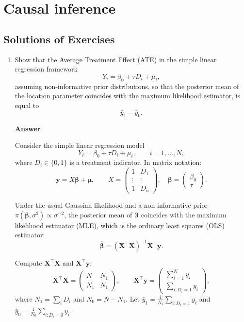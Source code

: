 \chapter{Causal inference}\label{chap12}

\section*{Solutions of Exercises}\label{sec12_1}
\begin{enumerate}[leftmargin=*]
\item Show that the Average Treatment Effect (ATE) in the simple linear regression framework
\[
Y_i = \beta_0 + \tau D_i + \mu_i,
\]
assuming non-informative prior distributions, so that the posterior mean of the location parameter coincides with the maximum likelihood estimator, is equal to
\[
\bar{y}_1 - \bar{y}_0.
\]

\textbf{Answer}

Consider the simple linear regression model
\[
Y_i = \beta_0 + \tau D_i + \mu_i, \qquad i = 1,\dots,N,
\]
where $D_i \in \{0,1\}$ is a treatment indicator. In matrix notation:
\[
\mathbf{y} = X \boldsymbol{\beta} + \boldsymbol{\mu}, \qquad
X = \begin{pmatrix}
	1 & D_1 \\
	\vdots & \vdots \\
	1 & D_n
\end{pmatrix}, \quad
\boldsymbol{\beta} = \begin{pmatrix}\beta_0 \\ \tau \end{pmatrix}.
\]

Under the usual Gaussian likelihood and a non-informative prior $\pi(\boldsymbol{\beta},\sigma^2) \propto \sigma^{-2}$, the posterior mean of $\boldsymbol{\beta}$ coincides with the maximum likelihood estimator (MLE), which is the ordinary least squares (OLS) estimator:
\[
\widehat{\boldsymbol{\beta}} = (\mathbf{X}^\top \mathbf{X})^{-1} \mathbf{X}^\top \mathbf{y}.
\]

Compute $\mathbf{X}^\top \mathbf{X}$ and $\mathbf{X}^\top \mathbf{y}$:
\[
\mathbf{X}^\top \mathbf{X} =
\begin{pmatrix}
	N & N_1 \\
	N_1 & N_1
\end{pmatrix}, \qquad
\mathbf{X}^\top \mathbf{y} =
\begin{pmatrix}
	\sum_{i=1}^N y_i \\
	\sum_{i:D_i=1} y_i
\end{pmatrix},
\]
where $N_1 = \sum_i D_i$ and $N_0 = N - N_1$. Let $\bar{y}_1 = \frac{1}{N_1}\sum_{i:D_i=1} y_i$ and $\bar{y}_0 = \frac{1}{N_0}\sum_{i:D_i=0} y_i$.


\end{enumerate}
